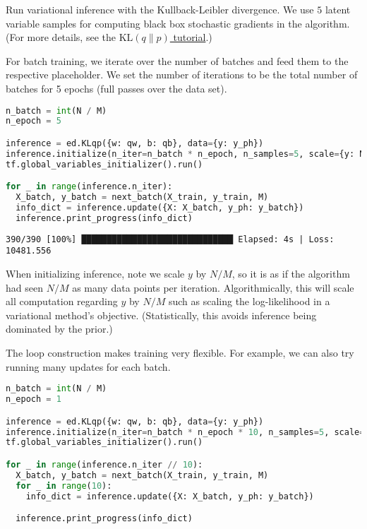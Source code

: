 Run variational inference with the Kullback-Leibler divergence.
We use $5$ latent variable samples for computing
black box stochastic gradients in the algorithm.
(For more details, see the
\href{/tutorials/klqp}{$\text{KL}(q\|p)$ tutorial}.)

For batch training, we iterate over the number of batches and
feed them to the respective placeholder. We set the number of
iterations to be the total number of batches for 5 epochs
(full passes over the data set).

\begin{lstlisting}[language=Python]
n_batch = int(N / M)
n_epoch = 5

inference = ed.KLqp({w: qw, b: qb}, data={y: y_ph})
inference.initialize(n_iter=n_batch * n_epoch, n_samples=5, scale={y: N / M})
tf.global_variables_initializer().run()

for _ in range(inference.n_iter):
  X_batch, y_batch = next_batch(X_train, y_train, M)
  info_dict = inference.update({X: X_batch, y_ph: y_batch})
  inference.print_progress(info_dict)
\end{lstlisting}

\begin{lstlisting}
390/390 [100%] ██████████████████████████████ Elapsed: 4s | Loss: 10481.556
\end{lstlisting}

When initializing inference, note we scale $y$ by $N/M$, so it is as if the
algorithm had seen $N/M$ as many data points per iteration.
Algorithmically, this will scale all computation regarding $y$ by
$N/M$ such as scaling the log-likelihood in a variational method's
objective. (Statistically, this avoids inference being dominated by the prior.)

The loop construction makes training very flexible. For example, we
can also try running many updates for each batch.

\begin{lstlisting}[language=Python]
n_batch = int(N / M)
n_epoch = 1

inference = ed.KLqp({w: qw, b: qb}, data={y: y_ph})
inference.initialize(n_iter=n_batch * n_epoch * 10, n_samples=5, scale={y: N / M})
tf.global_variables_initializer().run()

for _ in range(inference.n_iter // 10):
  X_batch, y_batch = next_batch(X_train, y_train, M)
  for _ in range(10):
    info_dict = inference.update({X: X_batch, y_ph: y_batch})

  inference.print_progress(info_dict)
\end{lstlisting}

